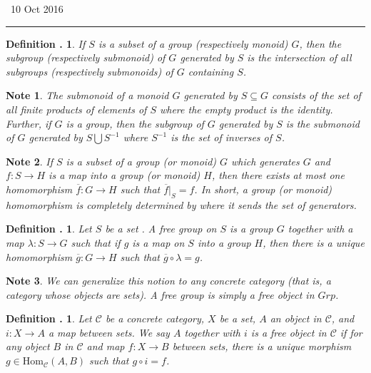 \documentclass[twoside]{report}
\newcommand{\Hom}{\textrm{Hom}}
\newcommand{\fanC}{\mathscr{C}}
\newcounter{Lecture}
\newcommand{\newLec}[1]{
  \stepcounter{Lecture}
  \noindent{\Large\bf Lecture \arabic{Lecture}} \, #1 \hfill  \rule[1ex]{2.5in}{.1pt} \vspace{1em}
}
\theoremstyle{myts}
\newcounter{c}[Lecture]
\newtheorem{dfn}[c]{Definition \arabic{Lecture}.}
\newtheorem*{nte}{Note}
\newcounter{ex}[Lecture]
\begin{document}
\newLec{10 Oct 2016}

\begin{dfn}
  If $S$ is a subset of a group (respectively monoid) $G$, then the \emph{subgroup} (respectively \emph{submonoid}) of $G$ \emph{generated by $S$} is the intersection of all subgroups (respectively submonoids) of $G$ containing $S$.
\end{dfn}

\begin{nte}
  The submonoid of a monoid $G$ generated by \( S \subseteq G \) consists of the set of all finite products of elements of $S$ where the empty product is the identity. Further, if $G$  is a group, then the subgroup of $G$ generated by $S$ is the submonoid of $G$ generated by \( S \bigcup S^{-1} \) where $S^{-1}$ is the set of inverses of $S$.
\end{nte}

\begin{nte}
  If $S$ is a subset of a group (or monoid) $G$ which generates $G$ and \( f : S \to H \) is a map into a group (or monoid) $H$, then there exists at most one homomorphism \( \overline{f} : G \to H \) such that \(\overline{f}|_S = f \). In short, a group (or monoid) homomorphism is completely determined by where it sends the set of generators.
\end{nte}

\begin{dfn}
  Let $S$ be a set . A \emph{free group} on $S$ is a group $G$ together with a map \( \lambda : S \to G \) such that if $g$ is a map on $S$ into a group $H$, then there is a unique homomorphism \( \overline{g} : G \to H \) such that \( \overline{g} \circ \lambda = g \).
\end{dfn}

\begin{nte}
  We can generalize this notion to any concrete category (that is, a category whose objects are sets). A free group is simply a free object in $Grp$.
\end{nte}

\begin{dfn}
  Let $\fanC$ be a concrete category, $X$ be a set, $A$ an object in $\fanC$, and \( i: X \to A \) a map between sets. We say $A$ together with $i$ is a \emph{free object} in $\fanC$ if for any object $B$ in $\fanC$ and map \( f : X \to B \) between sets, there is a unique morphism \(g\in\Hom_\fanC(A,B)\) such that \( g \circ i = f \).
\end{dfn}
\end{document}
